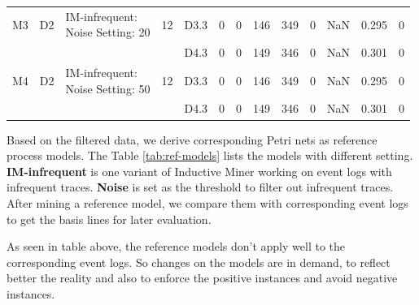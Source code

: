 \begin{table}[htp]
{\begin{tabular}{|llll|lllllllll|}
		M3                                                                      & D2                                                                        & \makecell[l]{IM-infrequent: \\ Noise Setting: 20} & 12                                                                         &D3.3 &  0  & 0   & 146   & 349   & 0       &NaN           &    0.295      & 0   \\
		
		&                                                                      & &                                                                          & D4.3 &  0  & 0   & 149   & 346   & 0       & NaN           &  0.301        &0    \\
		\hline 
		
		M4                                                                      & D2                                                                        & \makecell[l]{IM-infrequent: \\ Noise Setting: 50} & 12                                                                         &D3.3 &  0  &  0  &  146  & 349   & 0       & NaN           &     0.295     & 0\\   
		&                                                                      & &                                                                          & D4.3 &  0  & 0   & 149   & 346   & 0       & NaN           &  0.301        &0    \\
		
		\hline
	\end{tabular}
 }
\end{table}
Based on the filtered data, we derive corresponding Petri nets as reference process models. The Table \ref{tab:ref-models} lists the models with different setting. \textbf{IM-infrequent} is one variant of Inductive Miner working on event logs with infrequent traces. \textbf{Noise} is set as the threshold to filter out infrequent traces. After mining a reference model, we compare them with  corresponding event logs to get the basis lines for later evaluation.

As seen in table above, the reference models don't apply well to the corresponding event logs. So changes on the models are in demand, to reflect better the reality and also to enforce the positive instances and avoid negative instances. 
